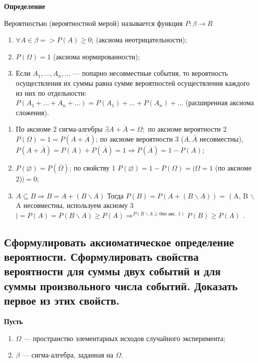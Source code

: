 \textbf{Определение}

Вероятностью (вероятностной мерой) называется функция $P: \beta \rightarrow R$

\begin{enumerate}
	\item $\forall A \in \beta => P(A) \geqslant 0$; (аксиома неотрицательности);
	\item $P(\Omega) = 1$ (аксиома нормированности);
	\item Если $A_1, \dots, A_n, \dots$ --- попарно несовместные события, то вероятность осуществления их суммы равна сумме вероятностей осуществления каждого из них по отдельности: $P(A_1 + \dots + A_n + \dots) = P(A_1) + \dots + P(A_n) + \dots$ (расширенная аксиома сложения). 
\end{enumerate}

\begin{enumerate}
	\item По аксиоме 2 сигма-алгебры $\exists A + \overline{A} = \Omega; $ по аксиоме вероятности 2 $P(\Omega) = 1 = P(A + \overline{A})$; по аксиоме вероятности 3 ($A, \overline{A}$ несовместны), $P(A + \overline{A}) = P(A) + P(\overline{A}) = 1 \Rightarrow P(\overline{A}) = 1 - P(A)$;
	\item $P(\varnothing) = P(\overline{\Omega})$; по свойству 1 $P(\varnothing) = 1 - P(\Omega) = \lgroup \Omega=1$ (по аксиоме 2)$\rgroup = 0$;
	\item $A \subseteq B \Rightarrow B = A + (B \backslash A)$ Тогда $P(B) = P(A + (B \backslash A)) =$ $\lgroup$ A, B $\backslash$ A несовместны, используем аксиому 3$\rgroup = P(A) = P(B \backslash A) \geqslant P(A) \Rightarrow^{{P(B\backslash A \geqslant 0 \text{по акс. 1})}} P(B) \geqslant P(A)$ .

\end{enumerate}

\subsection{Сформулировать аксиоматическое определение вероятности. Сформулировать свойства вероятности для суммы двух событий и для суммы произвольного числа событий. Доказать первое из этих свойств.}

\textbf{Пусть} 

\begin{enumerate}
	\item $\Omega$ --- пространство элементарных исходов случайного эксперимента;
	\item $\beta$ --- сигма-алгебра, заданная на $\Omega$.
\end{enumerate}

